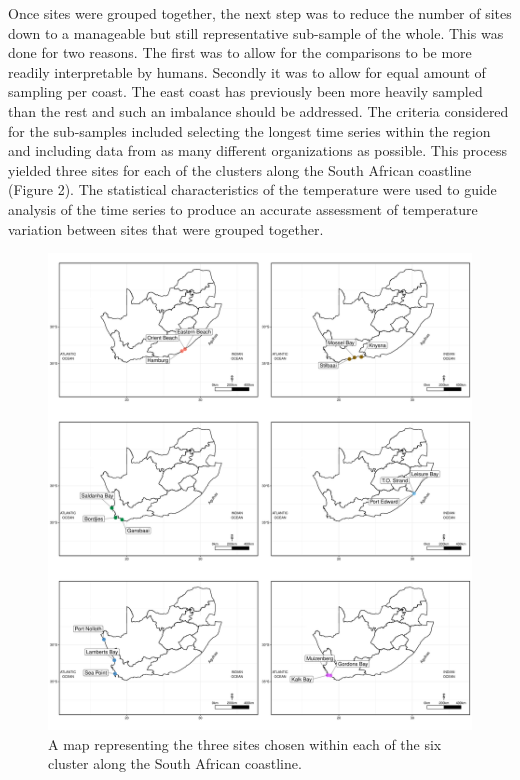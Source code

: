 \documentclass[12pt,A4paper,]{article}
\begin{document}
Once sites were grouped together, the next step was to reduce the number
of sites down to a manageable but still representative sub-sample of the
whole. This was done for two reasons. The first was to allow for the
comparisons to be more readily interpretable by humans. Secondly it was
to allow for equal amount of sampling per coast. The east coast has
previously been more heavily sampled than the rest and such an imbalance
should be addressed. The criteria considered for the sub-samples
included selecting the longest time series within the region and
including data from as many different organizations as possible. This
process yielded three sites for each of the clusters along the South
African coastline (Figure 2). The statistical characteristics of the
temperature were used to guide analysis of the time series to produce an
accurate assessment of temperature variation between sites that were
grouped together.

\begin{figure}
\centering
\includegraphics{../figures/final_combined_plot.pdf}
\caption{A map representing the three sites chosen within each of the
six cluster along the South African coastline.}
\end{figure}
\end{document}
